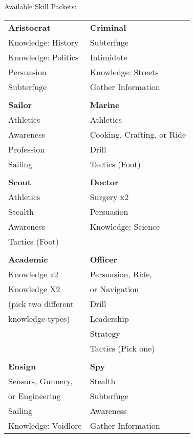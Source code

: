 \documentclass[a4paper, twocolumn, openany]{book}
\begin{document}
{\hspace*{1cm}Available Skill Packets:\\

{\centering
\begin{tabular}{ll}
{\bfseries Aristocrat}					& {\bfseries Criminal}				\\
Knowledge: History						& Subterfuge						\\
Knowledge: Politics 					& Intimidate						\\
Persuasion 								& Knowledge: Streets				\\
Subterfuge 								& Gather Information				\\
\\
{\bfseries Sailor}						& {\bfseries Marine}				\\
Athletics								& Athletics							\\
Awareness								& Cooking, Crafting, or Ride 		\\
Profession 								& Drill 							\\
Sailing 								& Tactics (Foot) 					\\
\\
{\bfseries Scout}						& {\bfseries Doctor}				\\
Athletics								& Surgery x2 						\\
Stealth									& Persuasion 						\\
Awareness								& Knowledge: Science				\\
Tactics (Foot)							&									\\
\\
{\bfseries Academic}					& {\bfseries Officer}				\\
Knowledge x2 							& Persuasion, Ride, 				\\
Knowledge X2 							& or Navigation						\\
(pick two different						& Drill								\\
 knowledge-types)						& Leadership 						\\
										& Strategy							\\
										& Tactics (Pick one) 				\\
\\
{\bfseries Ensign}						& {\bfseries Spy}					\\
Sensors, Gunnery, 						& Stealth							\\
or Engineering							& Subterfuge						\\
Sailing									& Awareness							\\
Knowledge: Voidlore						& Gather Information				\\

\end{tabular}}}
\end{document}
